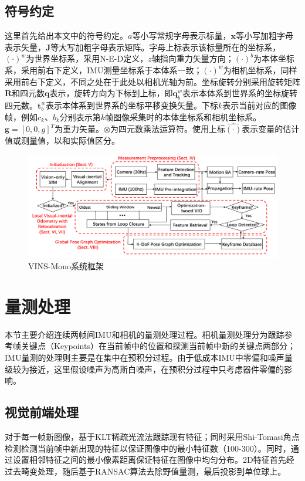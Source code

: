 \subsection{符号约定}
这里首先给出本文中的符号约定。$a$等小写常规字母表示标量，$\bm{x}$等小写加粗字母表示矢量，$\bm{J}$等大写加粗字母表示矩阵。字母上标表示该标量所在的坐标系，$\left(\cdot\right)^w$为世界坐标系，采用N-E-D定义，$z$轴指向重力矢量方向；$\left(\cdot\right)^b$为本体坐标系，采用前右下定义，IMU测量坐标系于本体系一致；$\left(\cdot\right)^w$为相机坐标系，同样采用前右下定义，不同之处在于此处以相机光轴为前。坐标旋转分别采用旋转矩阵$\bm{R}$和四元数$\bm{q}$表示，旋转方向为下标到上标，即$\bm{q}_b^w$表示本体系到世界系的坐标旋转四元数。$\bm{t}_b^w$表示本体系到世界系的坐标平移变换矢量。下标$k$表示当前对应的图像帧，例如$c_k$、$b_k$分别表示第$k$帧图像采集时的本体坐标系和相机坐标系。$\bm{g}=\left[0,0,g\right]^T$为重力矢量。$\otimes$为四元数乘法运算符。使用上标$\hat{\left(\cdot\right)}$表示变量的估计值或测量值，以和实际值区分。

\begin{figure}[htbp]
	\centering
	\includegraphics[scale=0.3]{VINS_structure.png}
	\caption{VINS-Mono系统框架}
	\label{fig.1}
\end{figure}      

\section{量测处理}
本节主要介绍连续两帧间IMU和相机的量测处理过程。相机量测处理分为跟踪参考帧关键点（Keypoints）在当前帧中的位置和探测当前帧中新的关键点两部分；IMU量测的处理则主要是在集中在预积分过程。由于低成本IMU中零偏和噪声量级较为接近，这里假设噪声为高斯白噪声，在预积分过程中只考虑器件零偏的影响。
\subsection{视觉前端处理}
对于每一帧新图像，基于KLT稀疏光流法跟踪现有特征；同时采用Shi-Tomasi角点检测检测当前帧中新出现的特征以保证图像中的最小特征数（100-300）。同时，通过设置相邻特征之间的最小像素距离保证特征在图像中均匀分布。2D特征首先经过去畸变处理，随后基于RANSAC算法去除野值量测，最后投影到单位球上。

